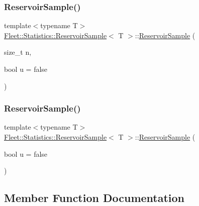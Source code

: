 \subsubsection{\texorpdfstring{Reservoir\+Sample()}{ReservoirSample()}\hspace{0.1cm}{\footnotesize\ttfamily [1/2]}}
{\footnotesize\ttfamily template$<$typename T$>$ \\
\hyperlink{class_fleet_1_1_statistics_1_1_reservoir_sample}{Fleet\+::\+Statistics\+::\+Reservoir\+Sample}$<$ T $>$\+::\hyperlink{class_fleet_1_1_statistics_1_1_reservoir_sample}{Reservoir\+Sample} (\begin{DoxyParamCaption}\item[{size\+\_\+t}]{n,  }\item[{bool}]{u = {\ttfamily false} }\end{DoxyParamCaption})\hspace{0.3cm}{\ttfamily [inline]}}

\mbox{\label{class_fleet_1_1_statistics_1_1_reservoir_sample_a39c8b405654eaca4c943263a485bc015}} 
\subsubsection{\texorpdfstring{Reservoir\+Sample()}{ReservoirSample()}\hspace{0.1cm}{\footnotesize\ttfamily [2/2]}}
{\footnotesize\ttfamily template$<$typename T$>$ \\
\hyperlink{class_fleet_1_1_statistics_1_1_reservoir_sample}{Fleet\+::\+Statistics\+::\+Reservoir\+Sample}$<$ T $>$\+::\hyperlink{class_fleet_1_1_statistics_1_1_reservoir_sample}{Reservoir\+Sample} (\begin{DoxyParamCaption}\item[{bool}]{u = {\ttfamily false} }\end{DoxyParamCaption})\hspace{0.3cm}{\ttfamily [inline]}}



\subsection{Member Function Documentation}
\mbox{\label{class_fleet_1_1_statistics_1_1_reservoir_sample_a374930296f502c957a925a5f7ba9087b}} 
